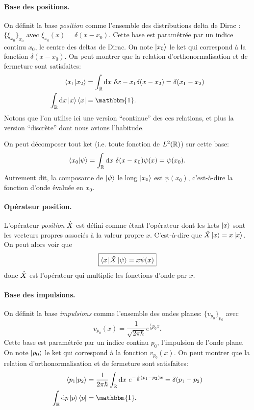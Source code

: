 \documentclass[11pt,a4paper,oneside]{article}
\begin{document}
\paragraph{Base des positions.} On définit la base \emph{position} comme l'ensemble des distributions delta de Dirac : $\{\xi_{x_0}\}_{x_0}$ avec $\xi_{x_0}(x)=\delta(x-x_0)$. Cette base est paramétrée par un indice continu $x_0$, le centre des deltas de Dirac. On note $\ket{x_0}$ le ket qui correspond à la fonction $\delta(x-x_0)$. On peut montrer que la relation d'orthonormalisation et de fermeture sont satisfaites:
\begin{align}
    \braket{x_1}{x_2} &= \int_{\R} \d x~\delta{x-x_1}\delta(x-x_2) = \delta(x_1-x_2)\\
    \int_{\R}\d x \ket{x}\bra{x} &= \mathbbm{1}.
\end{align}
Notons que l'on utilise ici une version ``continue'' des ces relations, et plus la version ``discrète'' dont nous avions l'habitude.

On peut décomposer tout ket (i.e. toute fonction de $L^2(\mathbb{R})$) sur cette base:
\begin{equation}
    \braket{x_0}{\psi} = \int_{\mathbb{R}}\text{d} x~\delta(x-x_0)\psi(x) = \psi(x_0).
\end{equation}
Autrement dit, la composante de $\ket{\psi}$ le long $\ket{x_0}$ est $\psi(x_0)$, c'est-à-dire la fonction d'onde évaluée en $x_0$.

\paragraph{Opérateur position.} L'opérateur \emph{position} $\hat{X}$ est défini comme étant l'opérateur dont les kets $\ket{x}$ sont les vecteurs propres associés à la valeur propre $x$. C'est-à-dire que $\hat{X}\ket{x}=x\ket{x}$. On peut alors voir que
\begin{equation}
    \boxed{\bra{x}\hat{X}\ket{\psi}=x\psi(x)}
\end{equation}
donc $\hat{X}$ est l'opérateur qui multiplie les fonctions d'onde par $x$.


\paragraph{Base des impulsions.} On définit la base \emph{impulsions} comme l'ensemble des ondes planes: $\{v_{p_0}\}_{p_0}$ avec 
\begin{equation}
    v_{p_0}(x) = \frac{1}{\sqrt{2\pi\hbar}}e^{\frac{i}{\hbar}p_0x}.
\end{equation}
Cette base est paramétrée par un indice continu $p_0$, l'impulsion de l'onde plane. On note $\ket{p_0}$ le ket qui correspond à la fonction $v_{p_0}(x)$. On peut montrer que la relation d'orthonormalisation et de fermeture sont satisfaites:
\begin{align}
    \braket{p_1}{p_2} &= \frac{1}{2\pi\hbar}\int_{\R} \d x~e^{-\frac{i}{\hbar}(p_1-p_2)x} = \delta(p_1-p_2)\\
    \int_{\R}\d p \ket{p}\bra{p} &= \mathbbm{1}.
\end{align}
\end{document}
